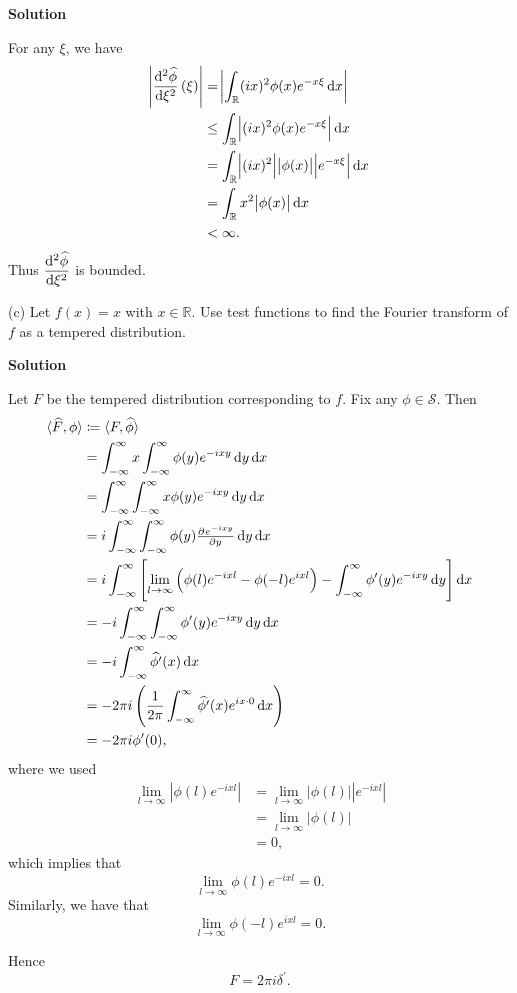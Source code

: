 \documentclass{article}
\begin{document}
\textbf{Solution}

For any $\xi$, we have
%
\begin{align*}
    \envert{\dod[2]{\widehat{\phi}}{\xi}(\xi)}
        &= \envert{\int_\mathbb{R} (i x)^2 \phi(x) e^{- x \xi} \dif x} \\
        &\leq \int_\mathbb{R} \envert{(i x)^2 \phi(x) e^{- x \xi}} \dif x \\
        &= \int_\mathbb{R} \envert{(i x)^2} \envert{\phi(x)} \envert{e^{- x \xi}} \dif x \\
        &= \int_\mathbb{R} x^2 \envert{\phi(x)} \dif x \\
        &< \infty
        .
\end{align*}
%
Thus $\dod[2]{\widehat{\phi}}{\xi}$ is bounded.

\vspace{5mm}

(c) Let $f(x) = x$ with $x \in \mathbb{R}$. Use test functions to find
the Fourier transform of $f$ as a tempered distribution.

\textbf{Solution}

Let $F$ be the tempered distribution corresponding to $f$. Fix any
$\phi \in \mathcal{S}$. Then
%
\begin{align*}
    \langle \widehat{F}, \phi \rangle
        &\coloneqq \langle F, \widehat{\phi} \rangle \\
        &= \int_{-\infty}^\infty x \int_{-\infty}^\infty \phi(y) e^{-i x y} \dif y \dif x \\
        &= \int_{-\infty}^\infty \int_{-\infty}^\infty x \phi(y) e^{-i x y} \dif y \dif x \\
        &= i \int_{-\infty}^\infty \int_{-\infty}^\infty \phi(y) \pd{e^{-i x y}}{y} \dif y \dif x \\
        &= i \int_{-\infty}^\infty
            \sbr{
                \lim_{l \to \infty} \del{\phi(l) e^{- i x l} - \phi(-l) e^{i x l}}
                - \int_{-\infty}^\infty \phi^\prime(y) e^{-i x y} \dif y
            }
            \dif x \\
        &= -i \int_{-\infty}^\infty
                \int_{-\infty}^\infty \phi^\prime(y) e^{-i x y} \dif y
            \dif x \\
        &= -i \int_{-\infty}^\infty \widehat{\phi^\prime}(x) \dif x \\
        &= -2 \pi i \del{\frac{1}{2 \pi} \int_{-\infty}^\infty \widehat{\phi^\prime}(x) e^{i x \cdot 0} \dif x} \\
        &= -2 \pi i \phi^\prime(0)
        ,
\end{align*}
%
where we used
%
\begin{align*}
    \lim_{l \to \infty} |\phi(l) e^{- i x l}|
        &= \lim_{l \to \infty} |\phi(l)| |e^{- i x l}| \\
        &= \lim_{l \to \infty} |\phi(l)| \\
        &= 0
        ,
\end{align*}
%
which implies that \[\lim_{l \to \infty} \phi(l) e^{- i x l} = 0.\]
Similarly, we have that \[\lim_{l \to \infty} \phi(-l) e^{i x l} = 0.\]

Hence \[F = 2 \pi i \delta^\prime.\]
\end{document}
